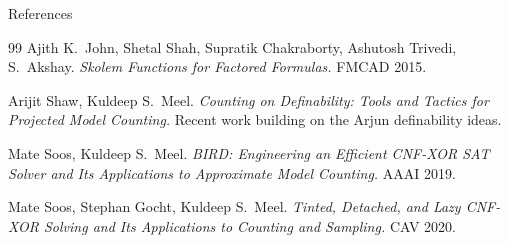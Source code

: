 \documentclass[aspectratio=169]{beamer}
\begin{document}
\begin{frame}[allowframebreaks]{References}
\begin{thebibliography}{99}
     Ajith K.\ John, Shetal Shah, Supratik
      Chakraborty, Ashutosh Trivedi, S.\ Akshay.
      \emph{Skolem Functions for Factored Formulas.}  FMCAD 2015.

     Arijit Shaw, Kuldeep S.\ Meel.
      \emph{Counting on Definability: Tools and Tactics for Projected
      Model Counting.}  Recent work building on the Arjun
      definability ideas.

     Mate Soos, Kuldeep S.\ Meel.
      \emph{BIRD: Engineering an Efficient CNF-XOR SAT Solver and Its
      Applications to Approximate Model Counting.}  AAAI 2019.

     Mate Soos, Stephan Gocht, Kuldeep S.\ Meel.
      \emph{Tinted, Detached, and Lazy CNF-XOR Solving and Its
      Applications to Counting and Sampling.}  CAV 2020.
  \end{thebibliography}
\end{frame}
\end{document}
